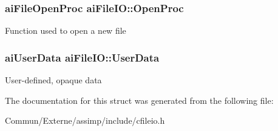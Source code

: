 \subsubsection[{\texorpdfstring{Open\+Proc}{OpenProc}}]{\setlength{\rightskip}{0pt plus 5cm}ai\+File\+Open\+Proc ai\+File\+I\+O\+::\+Open\+Proc}\hypertarget{structai_file_i_o_a819d9c7823039294125068d06949a6df}{}\label{structai_file_i_o_a819d9c7823039294125068d06949a6df}
Function used to open a new file 
\subsubsection[{\texorpdfstring{User\+Data}{UserData}}]{\setlength{\rightskip}{0pt plus 5cm}ai\+User\+Data ai\+File\+I\+O\+::\+User\+Data}\hypertarget{structai_file_i_o_a9c62b7f3d70fbb2f41e33ad0b9933139}{}\label{structai_file_i_o_a9c62b7f3d70fbb2f41e33ad0b9933139}
User-\/defined, opaque data 

The documentation for this struct was generated from the following file\+:\begin{DoxyCompactItemize}
\item 
Commun/\+Externe/assimp/include/cfileio.\+h\end{DoxyCompactItemize}
